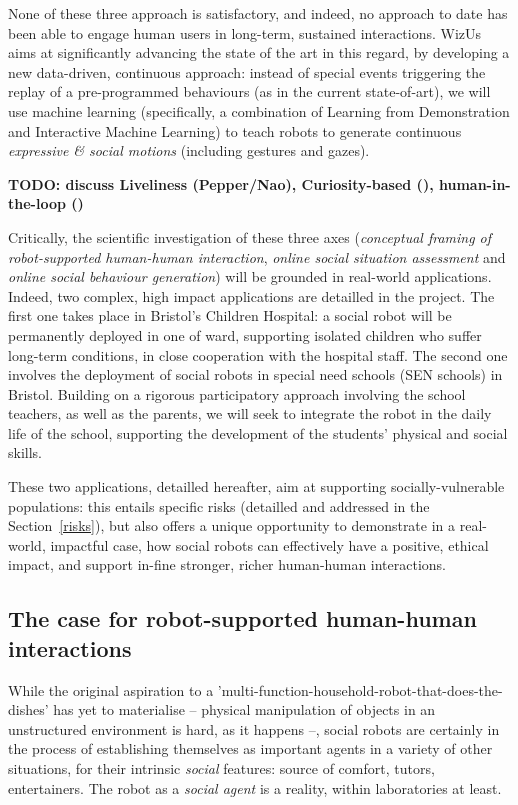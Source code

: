 \documentclass[11pt]{report}
\newcommand{\project}{WizUs\xspace}
\newcommand{\TODO}[1]{{\color{red}\textbf{TODO: #1}}}
\begin{document}
None of these three approach is satisfactory, and indeed, no approach to date
has been able to engage human users in long-term, sustained interactions.
\project aims at significantly advancing the state of the art in this regard, by
developing a new data-driven, continuous approach: instead of special events
triggering the replay of a pre-programmed behaviours (as in the current state-of-art), we
will use machine learning (specifically, a combination of Learning from
Demonstration and Interactive Machine Learning) to teach robots to generate
continuous \emph{expressive \& social motions} (including gestures and gazes).

\TODO{discuss Liveliness (Pepper/Nao), Curiosity-based (\cite{kaplan}),
human-in-the-loop (\cite{senft, winkle})}

Critically, the scientific investigation of these three axes (\emph{conceptual
framing of robot-supported human-human interaction}, \emph{online social
situation assessment} and \emph{online social behaviour generation}) will be
grounded in real-world applications. Indeed, two complex, high impact
applications are detailled in the project. The first one takes place in
Bristol's Children Hospital: a social robot will be permanently deployed in one
of ward, supporting isolated children who suffer long-term conditions, in close
cooperation with the hospital staff. The second one involves the deployment of 
social robots in special need schools (SEN schools) in Bristol. Building on a
rigorous participatory approach involving the school teachers, as well as the
parents, we will seek to integrate the robot in the daily life of the school,
supporting the development of the students' physical and social skills.

These two applications, detailled hereafter, aim at supporting
socially-vulnerable populations: this entails specific risks (detailled and
addressed in the Section~\ref{risks}), but also offers a unique opportunity to
demonstrate in a real-world, impactful case, how social robots can effectively
have a positive, ethical impact, and support in-fine stronger, richer
human-human interactions.



\subsection{The case for robot-supported human-human interactions}

While the original aspiration to a
'multi-function-household-robot-that-does-the-dishes' has yet to materialise --
physical manipulation of objects in an unstructured environment is hard, as it
happens --, social robots are certainly in the process of establishing
themselves as important agents in a variety of other situations, for their
intrinsic \emph{social} features: source of comfort, tutors, entertainers. The
robot as a \emph{social agent} is a reality, within laboratories at least.
\end{document}
